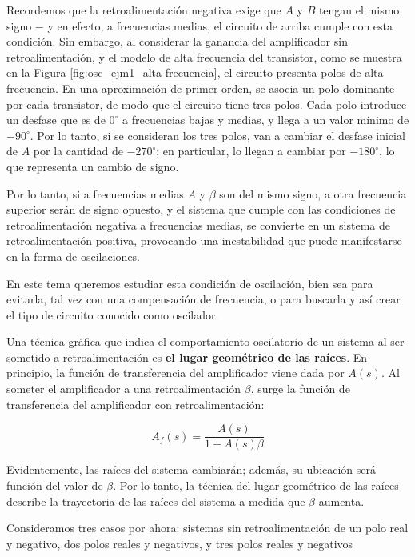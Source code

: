 Recordemos que la retroalimentación negativa exige que \( A \) y \( B \) tengan el mismo signo \( - \) y en efecto, a frecuencias medias, el circuito de arriba cumple con esta condición. Sin embargo, al considerar la ganancia del amplificador sin retroalimentación, y el modelo de alta frecuencia del transistor, como se muestra en la Figura \ref{fig:osc_ejm1_alta-frecuencia}, el circuito presenta polos de alta frecuencia. En una aproximación de primer orden, se asocia un polo dominante por cada transistor, de modo que el circuito tiene tres polos. Cada polo introduce un desfase que es de \( 0^\circ \) a frecuencias bajas y medias, y llega a un valor mínimo de \( -90^\circ \). Por lo tanto, si se consideran los tres polos, van a cambiar el desfase inicial de \( A \) por la cantidad de \( -270^\circ \); en particular, lo llegan a cambiar por \( -180^\circ \), lo que representa un cambio de signo. 

Por lo tanto, si a frecuencias medias \( A \) y \( \beta \) son del mismo signo, a otra frecuencia superior serán de signo opuesto, y el sistema que cumple con las condiciones de retroalimentación negativa a frecuencias medias, se convierte en un sistema de retroalimentación positiva, provocando una inestabilidad que puede manifestarse en la forma de oscilaciones.

En este tema queremos estudiar esta condición de oscilación, bien sea para evitarla, tal vez con una compensación de frecuencia, o para buscarla y así crear el tipo de circuito conocido como oscilador.

Una técnica gráfica que indica el comportamiento oscilatorio de un sistema al ser sometido a retroalimentación es \textbf{el lugar geométrico de las raíces}. En principio, la función de transferencia del amplificador viene dada por \( A(s) \). Al someter el amplificador a una retroalimentación \( \beta \), surge la función de transferencia del amplificador con retroalimentación:

\begin{equation}
	A_f(s) = \frac{A(s)}{1 + A(s)\beta}
\end{equation}

Evidentemente, las raíces del sistema cambiarán; además, su ubicación será función del valor de \( \beta \). Por lo tanto, la técnica del lugar geométrico de las raíces describe la trayectoria de las raíces del sistema a medida que \( \beta \) aumenta.

Consideramos tres casos por ahora:
sistemas sin retroalimentación de un polo real y negativo,
dos polos reales y negativos,
y tres polos reales y negativos 

